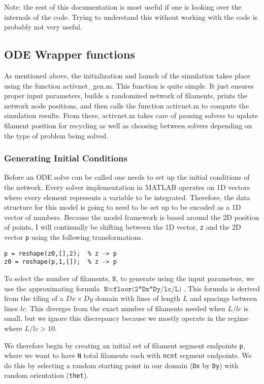 Note: the rest of this documentation is most useful if one is looking over the internals of the code.  Trying to understand this without working with the code is probably not very useful.

\subsection{ODE Wrapper functions }

As mentioned above, the initialization and launch of the simulation takes place using the function activnet\_gen.m.  This function is quite simple. It just ensures proper input parameters, builds a randomized network of filaments, prints the network node positions, and then calls the function activnet.m to compute the simulation results.  From there, activnet.m takes care of pausing solvers to update filament position for recycling as well as choosing between solvers depending on the type of problem being solved.  

\subsubsection{Generating Initial Conditions}

Before an ODE solve can be called one needs to set up the initial conditions of the network.  Every solver implementation in MATLAB operates on 1D vectors where every element represents a variable to be integrated.  Therefore, the data structure for this model is going to need to be set up to be encoded as a 1D vector of numbers.  Because the model framework is based around the 2D position of points, I will continually be shifting between the 1D vector, \texttt{z} and the 2D vector \texttt{p} using the following transformations.

\begin{verbatim}
p = reshape(z0,[],2);  % z -> p
z0 = reshape(p,1,[]);  % z -> p
\end{verbatim}

To select the number of filaments, $\texttt{N}$, to generate using the input parameters, we use the approximating formula $\texttt{N} \approx \texttt{floor(2*Dx*Dy/lc/L)}$.  This formula is derived from the tiling of a $Dx \times Dy$ domain with lines of length $L$ and spacings between lines $lc$.  This diverges from the exact number of filaments needed when $L/lc$ is small, but we ignore this discrepancy because we mostly operate in the regime where $L/lc>10$.

We therefore begin by creating an initial set of filament segment endpoints \texttt{p}, where we want to have \texttt{N} total filaments each with \texttt{ncnt} segment endpoints.  We do this by selecting a random starting point in our domain (\texttt{Dx} by \texttt{Dy}) with random orientation (\texttt{thet}).


